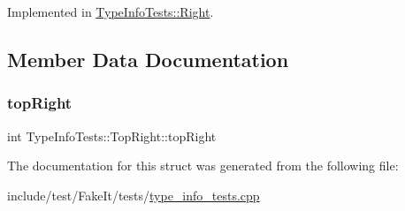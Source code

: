 Implemented in \mbox{\hyperlink{structTypeInfoTests_1_1Right_a7f3f464a9db9ae53e3b5dec2ef33ede4}{Type\+Info\+Tests\+::\+Right}}.



\subsection{Member Data Documentation}
\mbox{\label{structTypeInfoTests_1_1TopRight_a3525d425702ffa402688a521dcf9903f}} 
\subsubsection{\texorpdfstring{topRight}{topRight}}
{\footnotesize\ttfamily int Type\+Info\+Tests\+::\+Top\+Right\+::top\+Right}



The documentation for this struct was generated from the following file\+:\begin{DoxyCompactItemize}
\item 
include/test/\+Fake\+It/tests/\mbox{\hyperlink{type__info__tests_8cpp}{type\+\_\+info\+\_\+tests.\+cpp}}\end{DoxyCompactItemize}
